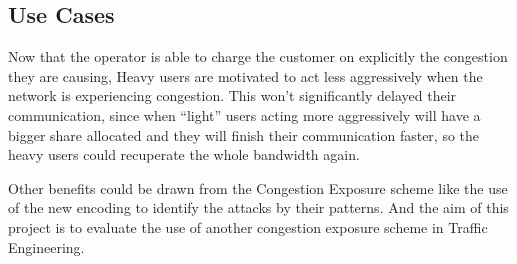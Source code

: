 \subsection{Use Cases}

Now that the operator is able to charge the customer on explicitly the congestion they are causing, Heavy users are motivated to act less aggressively when the network is experiencing congestion.  This won't significantly delayed their communication, since when “light” users acting more aggressively will have a bigger share allocated and they will finish their communication faster, so the heavy users could recuperate the whole bandwidth again. 

Other benefits could be drawn from the Congestion Exposure scheme like the use of the new encoding to identify the attacks by their patterns. And the aim of this project is to evaluate the use of another  congestion exposure scheme in Traffic Engineering.